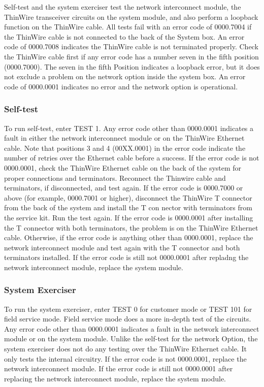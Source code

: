Self-test and the system exerciser test the network interconnect module,
the ThinWire transceiver circuits on the system module, and also perform
a loopback function on the ThinWire cable. All tests fail with an error
code of 0000.7004 if the ThinWire cable is not connected to the back of the
System box. An error code of 0000.7008 indicates the ThinWire cable is
not terminated properly. Check the ThinWire cable first if any error code
has a number seven in the fifth position (0000.7000). The seven in the fifth
Position indicates a loopback error, but it does not exclude a problem on the
network option inside the system box. An error code of 0000.0001 indicates
no error and the network option is operational.

\subsubsection{Self-test}

To run self-test, enter TEST 1. Any error code other than 0000.0001 indicates 
a fault in either the network interconnect module or on the ThinWire
Ethernet cable. Note that positions 3 and 4 (00XX.0001) in the error code
indicate the number of retries over the Ethernet cable before a success. If
the error code is not 0000.0001, check the ThinWire Ethernet cable on the
back of the system for proper connections and terminators. Reconnect the
Thinwire cable and terminators, if disconnected, and test again. If the error
code is 0000.7000 or above (for example, 0000.7001 or higher), disconnect
the ThinWire T connector from the back of the system and install the T con
nector with terminators from the service kit. Run the test again. If the error
code is 0000.0001 after installing the T connector with both terminators, the
problem is on the ThinWire Ethernet cable. Otherwise, if the error code
is anything other than 0000.0001, replace the network interconnect module
and test again with the T connector and both terminators installed. If the
error code is still not 0000.0001 after repladng the network interconnect
module, replace the system module.

\subsubsection{System Exerciser}

To run the system exerciser, enter TEST 0 for customer mode or TEST 101
for field service mode. Field service mode does a more in-depth test of
the circuits. Any error code other than 0000.0001 indicates a fault in the
network interconnect module or on the system module. Unlike the self-test
for the network Option, the system exerciser does not do any testing over
the ThinWire Ethernet cable. It only tests the internal circuitry. If the error
code is not 0000.0001, replace the network interconnect module. If the error
code is still not 0000.0001 after replacing the network interconnect module,
replace the system module.

